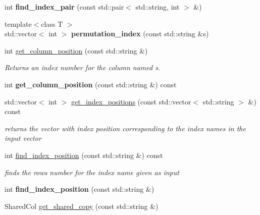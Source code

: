\begin{DoxyCompactItemize}
int {\bfseries find\+\_\+index\+\_\+pair} (const std\+::pair$<$ std\+::string, int $>$ \&)
\item 
\mbox{\label{classDataFrame_af53a20136b2c32d204eec54befc037df}} 
{\footnotesize template$<$class T $>$ }\\std\+::vector$<$ int $>$ {\bfseries permutation\+\_\+index} (const std\+::string \&s)
\item 
int \hyperlink{classDataFrame_ab65a5511fe18187411de973f99f196cd}{get\+\_\+column\+\_\+position} (const std\+::string \&)
\begin{DoxyCompactList}\small\item\em Returns an index number for the column named s. \end{DoxyCompactList}\item 
\mbox{\label{classDataFrame_a8fbc548d04ff3217809f737c1a6b0e9d}} 
int {\bfseries get\+\_\+column\+\_\+position} (const std\+::string \&) const
\item 
\mbox{\label{classDataFrame_a7e67febaaae85a774c61197bcbfc7bf5}} 
std\+::vector$<$ int $>$ \hyperlink{classDataFrame_a7e67febaaae85a774c61197bcbfc7bf5}{get\+\_\+index\+\_\+positions} (const std\+::vector$<$ std\+::string $>$ \&) const
\begin{DoxyCompactList}\small\item\em returns the vector with index position corresponding to the index names in the input vector \end{DoxyCompactList}\item 
\mbox{\label{classDataFrame_a9f2d00ceb463fe70ffedabc8152628c3}} 
int \hyperlink{classDataFrame_a9f2d00ceb463fe70ffedabc8152628c3}{find\+\_\+index\+\_\+position} (const std\+::string \&) const
\begin{DoxyCompactList}\small\item\em finds the rows number for the index name given as input \end{DoxyCompactList}\item 
\mbox{\label{classDataFrame_a3560b7fd300654f336d47f7843e51f42}} 
int {\bfseries find\+\_\+index\+\_\+position} (const std\+::string \&)
\item 
Shared\+Col \hyperlink{classDataFrame_a6386fb76796f1f414311486aa5f253be}{get\+\_\+shared\+\_\+copy} (const std\+::string \&)

\end{DoxyCompactItemize}

